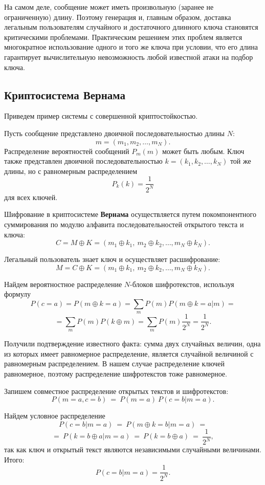 На самом деле, сообщение может иметь произвольную (заранее не ограниченную) длину. Поэтому генерация и, главным образом, доставка легальным пользователям случайного и достаточного длинного ключа становятся критическими проблемами. Практическим решением этих проблем является многократное использование одного и того же ключа при условии, что его длина гарантирует вычислительную невозможность любой известной атаки на подбор ключа.


\subsection{Криптосистема Вернама}

Приведем пример системы с совершенной криптостойкостью.

Пусть сообщение представлено двоичной последовательностью длины $N$:
    \[ m = (m_1, m_2, \dots, m_N). \]
Распределение вероятностей сообщений $P_m(m)$ может быть любым. Ключ также представлен двоичной последовательностью $ k = (k_1, k_2, \dots, k_N)$ той же длины, но с равномерным распределением
    \[ P_k(k) = \frac{1}{2^N} \]
для всех ключей.

Шифрование в криптосистеме \textbf{Вернама} осуществляется путем покомпонентного суммирования по модулю алфавита последовательностей открытого текста и ключа:
    \[ C = M \oplus K = (m_1 \oplus k_1, ~ m_2 \oplus k_2, \dots,  m_N \oplus k_N). \]

Легальный пользователь знает ключ и осуществляет расшифрование:
    \[ M =C \oplus K = (m_1 \oplus k_1, ~ m_2 \oplus k_2, \dots, m_N \oplus k_N). \]

Найдем вероятностное распределение $N$-блоков шифротекстов, используя формулу
    \[ P(c = a) = P(m \oplus k = a) = \sum_{m} P(m) P(m \oplus k = a | m) = \]
    \[ = \sum_{m} P(m) P(k \oplus m) = \sum_{m} P(m) \frac{1}{2^N} = \frac{1}{2^N}. \]

Получили подтверждение известного факта: сумма двух случайных величин, одна из которых имеет равномерное распределение, является случайной величиной с равномерным распределением. В нашем случае распределение ключей равномерное, поэтому распределение шифротекстов тоже равномерное.

Запишем совместное распределение открытых текстов и шифротекстов:
    \[ P(m = a, c = b) ~=~ P(m = a) ~ P(c = b | m = a). \]

Найдем условное распределение
    \[ P(c = b | m = a) ~=~ P(m \oplus k = b | m = a) ~= \]
    \[ =~ P(k = b \oplus a | m = a) ~=~ P(k = b \oplus a) ~=~ \frac{1}{2^N}, \]
так как ключ и открытый текст являются независимыми случайными величинами. Итого:
    \[ P(c=b | m=a) = \frac{1}{2^N}. \]

